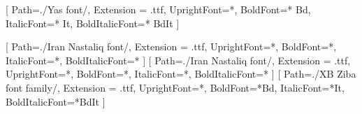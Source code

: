 [ 
    Path=./Yas font/,
    Extension = .ttf,
    UprightFont=*,
    BoldFont=* Bd,
    ItalicFont=* It,
    BoldItalicFont=* BdIt
    ]

[ 
    Path=./Iran Nastaliq font/,
    Extension = .ttf,
    UprightFont=*,
    BoldFont=*,
    ItalicFont=*,
    BoldItalicFont=*
    ]
[ 
    Path=./Iran Nastaliq font/,
    Extension = .ttf,
    UprightFont=*,
    BoldFont=*,
    ItalicFont=*,
    BoldItalicFont=*
    ]
[ 
    Path=./XB Ziba font family/,
    Extension = .ttf,
    UprightFont=*,
    BoldFont=*Bd,
    ItalicFont=*It,
    BoldItalicFont=*BdIt
    ]
\newenvironment{fantezi}
{\anotherfont }


\makeindex


\def\beginto{
\newpage
\begin{RTL}
\begin{Huge}


\begin{center}
\vspace*{0.15cm}

}

\def\endto{
~
\end{center}
\end{Huge}
\end{RTL}
}

\def\beginthanks{
\newpage

{\centering\Huge{}}
}

\def\endthanks{
~
}

\def\thanks{
\beginthanks
		\vspace*{\fill}
		
		\vspace*{\fill}
\endthanks
}

